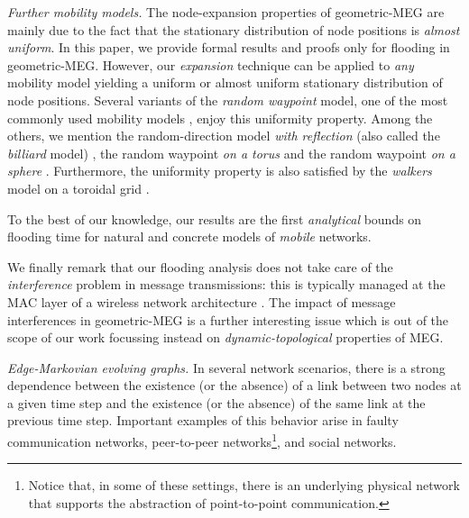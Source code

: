 \documentclass[10pt,a4paper]{article}
\begin{document}
\smallskip \noindent \emph{Further mobility models.} The node-expansion properties of geometric-MEG are mainly due to the fact that the stationary distribution of node positions is \emph{almost uniform}. In this paper, we provide formal results and proofs only for flooding in geometric-MEG. However, our \emph{expansion} technique can be applied to \emph{any} mobility model yielding a uniform or almost uniform stationary distribution of node positions. Several variants of the \emph{random waypoint} model, one of the most commonly used mobility models \cite{JN96,CBD02,LV05}, enjoy this uniformity property. Among the others, we mention the random-direction model \emph{with reflection} (also called the \emph{billiard } model) \cite{BL03,LV05,NTLL05}, the random waypoint \emph{on a torus} \cite{G87,H97,LV05,NTLL05} and the random waypoint \emph{on a sphere} \cite{LV05}. Furthermore, the uniformity property is also satisfied by the \emph{walkers} model on a toroidal grid \cite{DPSW08}.

To the best of our knowledge, our results are the first \emph{analytical} bounds on flooding time for natural and concrete models of \emph{mobile} networks.

We finally remark that our flooding analysis does not take care of the \emph{interference} problem in message transmissions: this is typically managed at the MAC layer of a wireless network architecture \cite{BL03,CMPS07}. The impact of message interferences in geometric-MEG is a further interesting issue which is out of the scope of our work focussing instead on \emph{dynamic-topological} properties of MEG.

\smallskip \noindent \emph{Edge-Markovian evolving graphs.}
In several network scenarios, there is a strong dependence between the existence (or the absence) of a link between two nodes at a given time step and the existence (or the absence) of the same link at the previous time step. Important examples of this behavior arise in faulty communication networks, peer-to-peer networks\footnote{Notice that, in some of these settings, there is an underlying physical network that supports the abstraction of point-to-point communication.}, and social networks.
\end{document}
